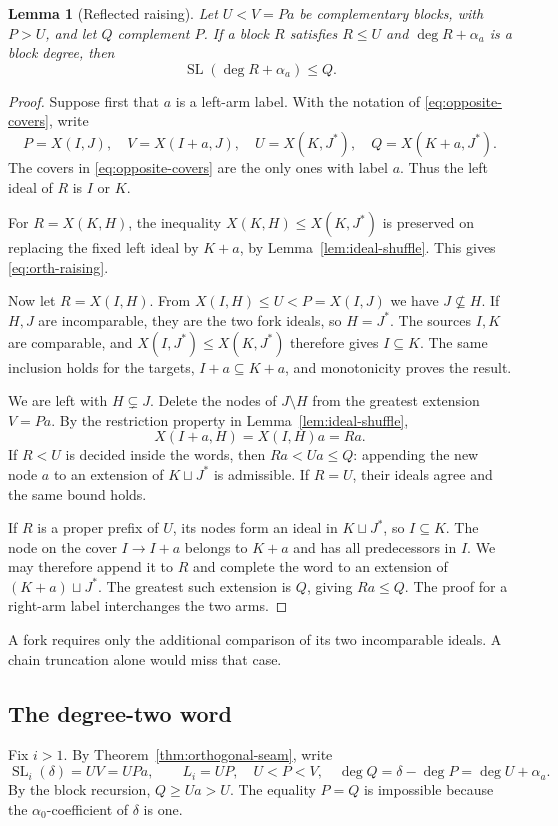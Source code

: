 \documentclass[11pt]{amsart}
\numberwithin{equation}{section}
\newtheorem{lemma}[theorem]{Lemma}
\theoremstyle{definition}
\DeclareMathOperator{\SL}{SL}
\begin{document}
\begin{lemma}[Reflected raising]\label{lem:orthogonal-raising}
Let $U<V=Pa$ be complementary blocks, with $P>U$, and let $Q$ complement $P$. If a block $R$ satisfies $R\leq U$ and $\deg R+\alpha_a$ is a block degree, then
\begin{equation}\label{eq:orth-raising}
 \SL(\deg R+\alpha_a)\leq Q.
\end{equation}
\end{lemma}
\begin{proof}
Suppose first that $a$ is a left-arm label. With the notation of \eqref{eq:opposite-covers}, write
\[
 P=X(I,J),\quad V=X(I+a,J),\quad
 U=X(K,J^*),\quad Q=X(K+a,J^*).
\]
The covers in \eqref{eq:opposite-covers} are the only ones with label $a$. Thus the left ideal of $R$ is $I$ or $K$.

For $R=X(K,H)$, the inequality $X(K,H)\leq X(K,J^*)$ is preserved on replacing the fixed left ideal by $K+a$, by Lemma~\ref{lem:ideal-shuffle}. This gives \eqref{eq:orth-raising}.

Now let $R=X(I,H)$. From $X(I,H)\leq U<P=X(I,J)$ we have $J\nsubseteq H$. If $H,J$ are incomparable, they are the two fork ideals, so $H=J^*$. The sources $I,K$ are comparable, and $X(I,J^*)\leq X(K,J^*)$ therefore gives $I\subseteq K$. The same inclusion holds for the targets, $I+a\subseteq K+a$, and monotonicity proves the result.

We are left with $H\subsetneq J$. Delete the nodes of $J\setminus H$ from the greatest extension $V=Pa$. By the restriction property in Lemma~\ref{lem:ideal-shuffle},
\[
 X(I+a,H)=X(I,H)a=Ra.
\]
If $R<U$ is decided inside the words, then $Ra<Ua\leq Q$: appending the new node $a$ to an extension of $K\sqcup J^*$ is admissible. If $R=U$, their ideals agree and the same bound holds.

If $R$ is a proper prefix of $U$, its nodes form an ideal in $K\sqcup J^*$, so $I\subseteq K$. The node on the cover $I\to I+a$ belongs to $K+a$ and has all predecessors in $I$. We may therefore append it to $R$ and complete the word to an extension of $(K+a)\sqcup J^*$. The greatest such extension is $Q$, giving $Ra\leq Q$. The proof for a right-arm label interchanges the two arms.
\end{proof}

A fork requires only the additional comparison of its two incomparable ideals. A chain truncation alone would miss that case.

\subsection{The degree-two word}\label{subsec:orthogonal-degree-two}
Fix $i>1$. By Theorem~\ref{thm:orthogonal-seam}, write
\begin{equation}\label{eq:orth-setup}
 \SL_i(\delta)=UV=UPa,\qquad
 L_i=UP,\quad U<P<V,\quad
 \deg Q=\delta-\deg P=\deg U+\alpha_a.
\end{equation}
By the block recursion, $Q\geq Ua>U$. The equality $P=Q$ is impossible because the $\alpha_0$-coefficient of $\delta$ is one.
\end{document}
